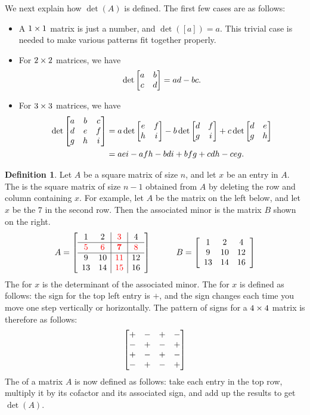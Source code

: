 \documentclass[a4paper]{book}
\theoremstyle{definition}
\newtheorem{definition}[theorem]{Definition}
\begin{document}
We next explain how $\det(A)$ is defined.  The first few cases are as
follows:
\begin{itemize}
 \item A $1\times 1$ matrix is just a number, and $\det([a])=a$.  This
  trivial case is needed to make various patterns fit together
  properly. 
 \item For $2\times 2$ matrices, we have 
  \[ \det\begin{bmatrix} a & b \\ c & d \end{bmatrix} = ad-bc. \]
 \item For $3\times 3$ matrices, we have
  \begin{align*}
   \det\begin{bmatrix} a&b&c \\ d&e&f \\ g&h&i \end{bmatrix} &= 
    a\det\begin{bmatrix} e&f\\h&i \end{bmatrix} -
    b\det\begin{bmatrix} d&f\\g&i \end{bmatrix} +
    c\det\begin{bmatrix} d&e\\g&h \end{bmatrix} \\
   &= aei-afh-bdi+bfg+cdh-ceg.
  \end{align*}
\end{itemize}
\begin{definition}
 Let $A$ be a square matrix of size $n$, and let $x$ be an entry in
 $A$.  The  is the square matrix of size $n-1$
 obtained from $A$ by deleting the row and column containing $x$.  For
 example, let $A$ be the matrix on the left below, and let $x$ be the
 $7$ in the second row.  Then the associated minor is the matrix $B$
 shown on the right.
 {\small \[  A=\left[\begin{array}{cc|c|c}
      1&2&{\color{red}3}&4\\
      \hline
      {\color{red}5}&{\color{red}6}&{\color{red}\mathbf{7}}&{\color{red}8}\\
      \hline
      9&10&{\color{red}11}&12\\
      13&14&{\color{red}15}&16
     \end{array}\right]
  \hspace{3em}
   B = \left[\begin{array}{ccc}
    1&2&4 \\ 9&10&12 \\ 13&14&16 
   \end{array}\right] 
 \]}
 The  for $x$ is the determinant of the associated
 minor.  The  for $x$ is defined as follows: the
 sign for the top left entry is $+$, and the sign changes each time
 you move one step vertically or horizontally.  The pattern of signs
 for a $4\times 4$ matrix is therefore as follows:
 {\small \[ \begin{bmatrix} +&-&+&- \\ -&+&-&+ \\ +&-&+&- \\ -&+&-&+ \end{bmatrix} \]}
 The  of a matrix $A$ is now defined as follows:
 take each entry in the top row, multiply it by its cofactor and its
 associated sign, and add up the results to get $\det(A)$.
\end{definition}
\end{document}
